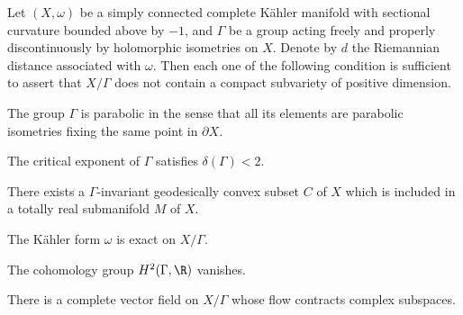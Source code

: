 \begin{proposition}\label{prop-criteres}
Let $(X,\omega)$ be a simply connected complete Kähler manifold with sectional curvature bounded above by $-1$, and $\Gamma$ be a group acting freely and properly discontinuously by holomorphic isometries on $X$. Denote by $d$ the Riemannian distance associated with $\omega$. Then each one of the following condition is sufficient to assert that $X/\Gamma$ does not contain a compact subvariety of positive dimension.\begin{enumeratea}
\item\label{prop-criteresa} The group $\Gamma$ is parabolic in the sense that all its elements are parabolic isometries fixing the same point in $\partial X$.
\item\label{prop-criteresb} The critical exponent of $\Gamma$ satisfies $\delta(\Gamma)<2$.
\item\label{prop-criteresc} There exists a $\Gamma$\nobreakdash-invariant geodesically convex subset $C$ of $X$ which is included in a totally real submanifold $M$ of $X$.
\item\label{prop-criteresd} The Kähler form $\omega$ is exact on $X/\Gamma$.
\item\label{prop-criterese} The cohomology group $H^{2}(\Gamma,\R)$ vanishes.
\item\label{prop-criteresf} There is a complete vector field on $X/\Gamma$ whose flow contracts complex subspaces.
\end{enumeratea}
\end{proposition}

